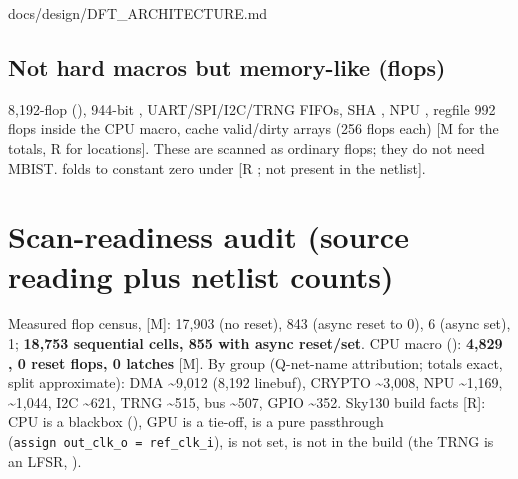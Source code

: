 \begin{relocated}{docs/design/DFT_ARCHITECTURE.md}
\subsection{Not hard macros but memory-like (flops)}\label{tm:ch:dft-architecture:32-not-hard-macros-but-memory-like-flops}

8,192-flop  (), 944-bit
,
UART/\allowbreak{}SPI/\allowbreak{}I2C/\allowbreak{}TRNG FIFOs, SHA
, NPU , regfile 992 flops inside the CPU
macro, cache valid/\allowbreak{}dirty arrays (256 flops each) {[}M for
the totals, R for locations{]}. These are scanned as ordinary flops;
they do not need MBIST.  folds to constant zero under
 {[}R ; not present in the
netlist{]}.

\section{Scan-readiness audit (source reading plus netlist counts)}\label{tm:ch:dft-architecture:4-scan-readiness-audit-source-reading-plus-netlist-counts}

Measured flop census,
{[}M{]}:  17,903 (no reset),  843 (async
reset to 0),  6 (async set),  1;
\textbf{18,753 sequential cells, 855 with async reset/set}. CPU macro
(): \textbf{4,829 , 0 reset
flops, 0 latches} {[}M{]}. By group (Q-net-name attribution; totals
exact, split approximate): DMA \textasciitilde9,012 (8,192 linebuf),
CRYPTO \textasciitilde3,008, NPU \textasciitilde1,169,
 \textasciitilde1,044, I2C \textasciitilde621, TRNG
\textasciitilde515, bus \textasciitilde507, GPIO \textasciitilde352.
Sky130 build facts {[}R{]}: CPU is a blackbox
(), GPU is a tie-off, 
is a pure passthrough
(\texttt{assign\ out\_\allowbreak{}clk\_\allowbreak{}o\ =\allowbreak{}\ ref\_\allowbreak{}clk\_\allowbreak{}i}),
 is not set,  is not in the
build (the TRNG is an LFSR, ).

{\footnotesize\setlength{\tabcolsep}{3pt}

}
\end{relocated}
